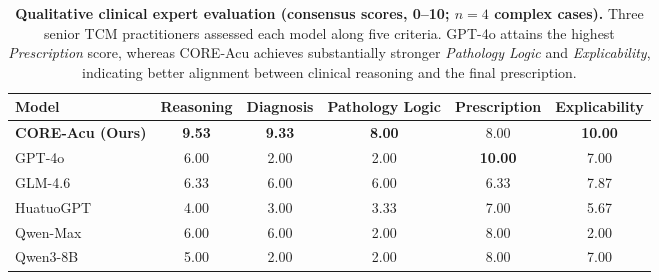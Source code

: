\documentclass[preprint,5p,times,twocolumn,fleqn]{elsarticle}
\begin{document}
\begin{table}[htbp]
\centering
\caption{\textbf{Qualitative clinical expert evaluation (consensus scores, 0--10; $n=4$ complex cases).}
Three senior TCM practitioners assessed each model along five criteria. GPT-4o attains the highest \textit{Prescription} score, whereas CORE-Acu achieves substantially stronger \textit{Pathology Logic} and \textit{Explicability}, indicating better alignment between clinical reasoning and the final prescription.}
\label{tab:expert_eval}
\renewcommand{\arraystretch}{1.3}
\setlength{\tabcolsep}{14pt}

\begin{tabular}{lccccc}
\toprule[1.5pt]
\textbf{Model} & \textbf{Reasoning} & \textbf{Diagnosis} & \textbf{Pathology Logic} & \textbf{Prescription} & \textbf{Explicability} \\
\midrule
\textbf{CORE-Acu (Ours)} & \textbf{9.53} & \textbf{9.33} & \textbf{8.00} & 8.00 & \textbf{10.00} \\
GPT-4o & 6.00 & 2.00 & 2.00 & \textbf{10.00} & 7.00 \\
GLM-4.6 & 6.33 & 6.00 & 6.00 & 6.33 & 7.87 \\
HuatuoGPT & 4.00 & 3.00 & 3.33 & 7.00 & 5.67 \\
Qwen-Max & 6.00 & 6.00 & 2.00 & 8.00 & 2.00 \\
Qwen3-8B & 5.00 & 2.00 & 2.00 & 8.00 & 7.00 \\
\bottomrule[1.5pt]
\end{tabular}
\end{table}
\end{document}
